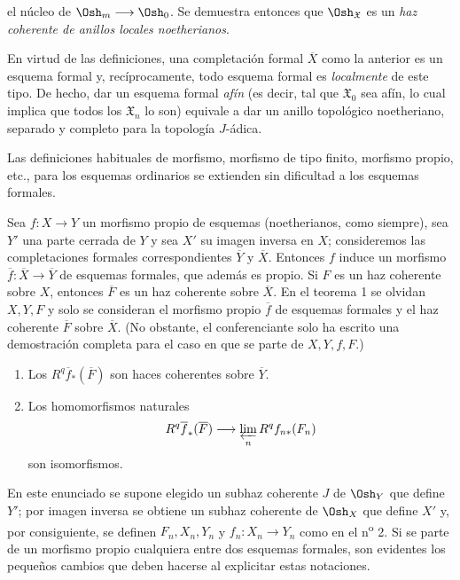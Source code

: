 el núcleo de $\Osh_m\longrightarrow\Osh_0$. Se demuestra entonces que
$\Osh_{\mathfrak X}$ es un \emph{haz coherente de anillos locales
noetherianos}.

En virtud de las definiciones, una completación formal $\overline X$ como la
anterior es un esquema formal y, recíprocamente, todo esquema formal es
\emph{localmente} de este tipo. De hecho, dar un esquema formal \emph{afín} (es
decir, tal que $\mathfrak X_0$ sea afín, lo cual implica que todos los
$\mathfrak X_n$ lo son) equivale a dar un anillo topológico noetheriano,
separado y completo para la topología $J$-ádica.

Las definiciones habituales de morfismo, morfismo de tipo finito, morfismo
propio, etc., para los esquemas ordinarios se extienden sin dificultad a los
esquemas formales.


Sea $f:X\longrightarrow Y$ un morfismo propio de esquemas (noetherianos, como
siempre), sea $Y'$ una parte cerrada de $Y$ y sea $X'$ su imagen inversa en
$X$; consideremos las completaciones formales correspondientes $\overline Y$ y
$\overline X$. Entonces $f$ induce un morfismo
$\overline f:\overline X\longrightarrow\overline Y$ de esquemas formales, que
además es propio. Si $F$ es un haz coherente sobre $X$, entonces $\overline F$
es un haz coherente sobre $\overline X$. En el teorema 1 se olvidan $X,Y,F$ y
solo se consideran el morfismo propio $\overline f$ de esquemas formales y el
haz coherente $\overline F$ sobre $\overline X$. (No obstante, el conferenciante
solo ha escrito una demostración completa para el caso en que se parte de
$X,Y,f,F$.)

\begin{enumerate}
  \item[\textit{i.}] Los $R^{q}\overline f_{*}(\overline F)$ son haces
    coherentes sobre $\overline Y$.
  \item[\textit{ii.}] Los homomorfismos naturales
    \[
      R^{q}\overline f_{*}(\overline F)
      \longrightarrow \varprojlim_n R^{q}f_{n*}(F_n)
    \]
    son isomorfismos.
\end{enumerate}

En este enunciado se supone elegido un subhaz coherente $J$ de $\Osh_Y$ que
define $Y'$; por imagen inversa se obtiene un subhaz coherente de $\Osh_X$ que
define $X'$ y, por consiguiente, se definen $F_n,X_n,Y_n$ y
$f_n:X_n\longrightarrow Y_n$ como en el n\textsuperscript{o} 2. Si se parte de
un morfismo propio cualquiera entre dos esquemas formales, son evidentes los
pequeños cambios que deben hacerse al explicitar estas notaciones.

